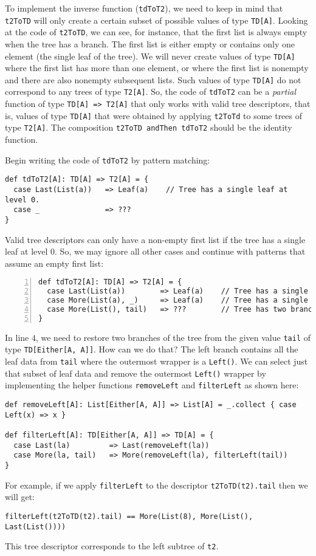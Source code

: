 To implement the inverse function (\lstinline!tdToT2!), we need to
keep in mind that \lstinline!t2ToTD! will only create a certain subset
of possible values of type \lstinline!TD[A]!. Looking at the code
of \lstinline!t2ToTD!, we can see, for instance, that the first list
is always empty when the tree has a branch. The first list is either
empty or contains only one element (the single leaf of the tree).
We will never create values of type \lstinline!TD[A]! where the first
list has more than one element, or where the first list is nonempty
and there are also nonempty subsequent lists. Such values of type
\lstinline!TD[A]! do not correspond to any trees of type \lstinline!T2[A]!.
So, the code of \lstinline!tdToT2! can be a \emph{partial} function
of type \lstinline!TD[A] => T2[A]! that only works with valid tree
descriptors, that is, values of type \lstinline!TD[A]! that were
obtained by applying \lstinline!t2ToTd! to some trees of type \lstinline!T2[A]!.
The composition \lstinline!t2ToTD andThen tdToT2! should be the identity
function.

Begin writing the code of \lstinline!tdToT2! by pattern matching:
\begin{lstlisting}
def tdToT2[A]: TD[A] => T2[A] = {
  case Last(List(a))   => Leaf(a)    // Tree has a single leaf at level 0.
  case _               => ???
}
\end{lstlisting}
Valid tree descriptors can only have a non-empty first list if the
tree has a single leaf at level $0$. So, we may ignore all other
cases and continue with patterns that assume an empty first list:
\begin{lstlisting}[numbers=left]
def tdToT2[A]: TD[A] => T2[A] = {
  case Last(List(a))        => Leaf(a)    // Tree has a single leaf at level 0.
  case More(List(a), _)     => Leaf(a)    // Tree has a single leaf at level 0.         
  case More(List(), tail)   => ???        // Tree has two branches. 
}
\end{lstlisting}
In line $4$, we need to restore two branches of the tree from the
given value \lstinline!tail! of type \lstinline!TD[Either[A, A]]!.
How can we do that? The left branch contains all the leaf data from
\lstinline!tail! where the outermost wrapper is a \lstinline!Left()!.
We can select just that subset of leaf data and remove the outermost
\lstinline!Left()! wrapper by implementing the helper functions \lstinline!removeLeft!
and \lstinline!filterLeft! as shown here:
\begin{lstlisting}
def removeLeft[A]: List[Either[A, A]] => List[A] = _.collect { case Left(x) => x }

def filterLeft[A]: TD[Either[A, A]] => TD[A] = {
  case Last(la)         => Last(removeLeft(la))
  case More(la, tail)   => More(removeLeft(la), filterLeft(tail))
}
\end{lstlisting}
For example, if we apply \lstinline!filterLeft! to the descriptor
\lstinline!t2ToTD(t2).tail! then we will get:
\begin{lstlisting}
filterLeft(t2ToTD(t2).tail) == More(List(8), More(List(), Last(List())))
\end{lstlisting}
This tree descriptor corresponds to the left subtree of \lstinline!t2!.

